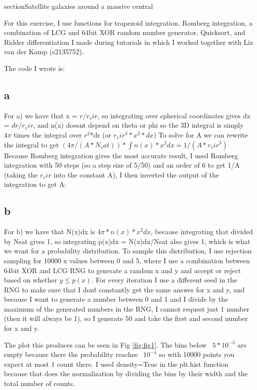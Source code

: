 section{Satellite galaxies around a massive central}

For this exercise, I use functions for trapezoid integration, Romberg integration, a combination of 
LCG and 64bit XOR random number generator, Quicksort, and Ridder differentiation I made during tutorials in 
which I worked together with Liz van der Kamp (s2135752).


The code I wrote is:


\subsection{a}

For a) we have that x = $r/r_vir$, so integrating over spherical coordinates gives dx = $dr/r_vir$, 
and n(x) doesnt depend on theta or phi so the 3D integral is simply $4\pi$ times the integral over 
$r^2$*dr (or $r_vir^3*x^2*dx$)
To solve for A we can rewrite the integral to get $(4\pi/(A*N_sat))*\int n(x)*x^2 dx = 1/(A*r_vir^3)$
Because Romberg integration gives the most accurate result, I used Romberg integration with 50 steps 
(so a step size of 5/50) and an order of 6 to get 1/A (taking the $r_vir$ into the constant A),
I then inverted the output of the integration to get A:


\subsection{b}

For b) we have that N(x)dx is $4\pi*n(x)*x^2 dx$, because integrating that divided by Nsat gives 1, 
so integrating p(x)dx = N(x)dx/Nsat also gives 1, which is what we want for a probability distribution.
To sample this distribution, I use rejection sampling for 10000 x values between 0 and 5,
where I use a combination between 64bit XOR and LCG RNG to generate a random x and y and accept or reject
based on whether $y \leq p(x)$. For every iteration I use a different seed in the RNG to make sure that I 
don\'t constantly get the same answer for x and y, and because I want to generate a number between 0 and 1 
and I divide by the maximum of the generated numbers in the RNG, I cannot request just 1 number 
(then it will always be 1), so I generate 50 and take the first and second number for x and y.

The plot this produces can be seen in Fig \ref{fig:fig1}. The bins below ~$5*10^{-3}$ are empty because there 
the probability reaches ~$10^{-4}$ so with 10000 points you expect at most 1 count there. 
I used density=True in the plt.hist function because that does the normalization by dividing the bins by 
their width and the total number of counts.

